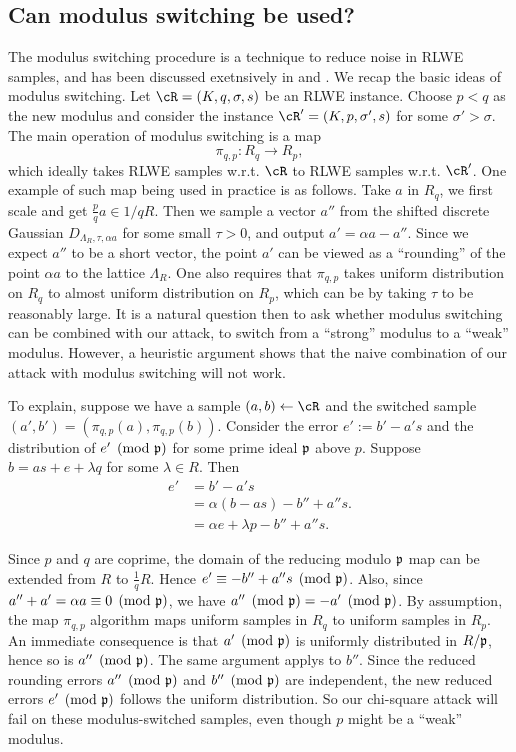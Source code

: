 \documentclass{amsart}
\begin{document}
\subsection{Can modulus switching be used?}
The modulus switching procedure is a technique to reduce noise
in RLWE samples, and has been discussed exetnsively in  \cite{brakerski2012leveled} and \cite{langlois2014worst}.
We recap the basic ideas of modulus switching. Let $\cR = (K, q, \sigma, s)$ be an RLWE instance. Choose $p < q$ as the new modulus and consider the instance $\cR' = (K,p,\sigma',s)$ for some $\sigma' > \sigma$. The main operation of modulus switching is a map
\[
\pi_{q,p} : R_q \to R_p,
\]
which ideally takes RLWE samples w.r.t. $\cR$ to RLWE samples w.r.t. $\cR'$. One example of such map being used in practice is as follows. Take $a$ in $R_q$, we first scale and get $\frac{p}{q}a \in 1/q R$. Then we sample a vector $a''$ from the shifted discrete Gaussian $D_{\Lambda_R, \tau, \alpha a}$ for some small $\tau > 0$, and output $a' = \alpha a - a''$. Since we expect $a''$ to be a  short vector, the point $a'$ can be viewed as a ``rounding'' of the point $\alpha a$ to the lattice $\Lambda_R$. One also requires that $\pi_{q,p}$ takes uniform distribution on $R_q$ to almost uniform distribution on $R_p$, which can be by taking $\tau$ to be reasonably large. It is a natural question then to ask whether modulus switching can be combined with our attack, to switch from a ``strong'' modulus to a ``weak'' modulus. However, a heuristic argument shows that the naive combination of our attack with modulus switching will not work.

To explain, suppose we have a sample $(a,b) \gets \cR$ and the switched sample $(a', b') = (\pi_{q,p}(a),\pi_{q,p}(b))$. Consider the error $e':= b' - a's$ and the distribution of $e' \pmod{\mathfrak{p}}$ for some prime ideal $\mathfrak{p}$ above $p$. Suppose $b = as+e+ \lambda q$ for some $\lambda \in R$. Then
\begin{align*}
    e' &= b' - a's  \\
    &= \alpha(b-as) - b''  + a''s. \\
    & = \alpha e + \lambda p - b'' + a''s.
\end{align*}

Since $p$ and $q$ are coprime, the domain of the reducing modulo $\mathfrak{p}$ map can be extended from $R$ to $\frac{1}{q}R$. Hence $e' \equiv - b'' + a'' s \pmod{\mathfrak{p}}$. Also, since $a'' + a' = \alpha a \equiv 0 \pmod {\mathfrak{p}}$, we have $a'' \pmod{\mathfrak{p}} = -a' \pmod{\mathfrak{p}}$. By assumption, the map $\pi_{q,p}$ algorithm maps uniform samples in $R_q$ to uniform samples in $R_p$. An immediate consequence is that $a' \pmod{\mathfrak{p}}$ is uniformly distributed in $R/\mathfrak{p}$, hence so is $a'' \pmod{\mathfrak{p}}$. The same argument applys to $b''$. Since the reduced rounding errors $a'' \pmod{\mathfrak{p}}$ and $b'' \pmod{\mathfrak{p}}$ are independent, the new reduced errors $e' \pmod{\mathfrak{p}}$ follows the uniform distribution. So our chi-square attack will fail on these modulus-switched samples, even though $p$ might be a ``weak'' modulus.
\end{document}
